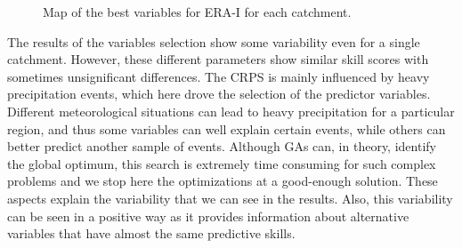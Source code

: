 \documentclass[draft]{agujournal2019}
\begin{document}
\begin{figure}[hbt]
	\noindent{}
	\caption{Map of the best variables for ERA-I for each catchment.}
	\label{fig_map_variables}
\end{figure}

The results of the variables selection show some variability even for a single catchment. However, these different parameters show similar skill scores with sometimes unsignificant differences. The CRPS is mainly influenced by heavy precipitation events, which here drove the selection of the predictor variables. Different meteorological situations can lead to heavy precipitation for a particular region, and thus some variables can well explain certain events, while others can better predict another sample of events. Although GAs can, in theory, identify the global optimum, this search is extremely time consuming for such complex problems and we stop here the optimizations at a good-enough solution. These aspects explain the variability that we can see in the results. Also, this variability can be seen in a positive way as it provides information about alternative variables that have almost the same predictive skills.
\end{document}
